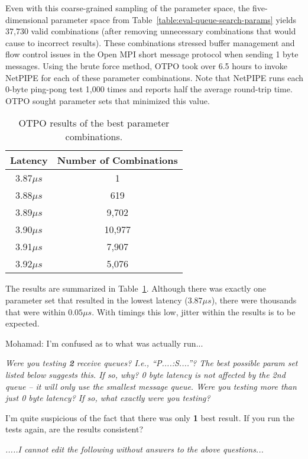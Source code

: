 Even with this coarse-grained sampling of the parameter space, the
five-dimensional parameter space from
Table~\ref{table:eval-queue-search-params} yields 37,730 valid combinations
(after removing unnecessary combinations that would cause to incorrect
results). These combinations stressed buffer management and flow control
issues in the Open MPI short message protocol when sending 1 byte
messages. Using the brute force method, OTPO took over 6.5 hours to invoke
NetPIPE for each of these parameter combinations.  Note that NetPIPE runs each
0-byte ping-pong test 1,000 times and reports half the average round-trip
time.  OTPO sought parameter sets that minimized this value.

\begin{table}[tb]
\centering
\caption{OTPO results of the best parameter combinations.}
\label{table:results} 
\begin{tabular}{|c|c|} \hline
Latency & Number of Combinations \\
\hline
3.87$\mu s$  & 1\\
\hline
3.88$\mu s$  & 619\\
\hline
3.89$\mu s$  & 9,702\\
\hline
3.90$\mu s$  & 10,977\\
\hline
3.91$\mu s$  & 7,907\\
\hline
3.92$\mu s$  & 5,076\\
\hline
\end{tabular}  
\end{table}

The results are summarized in Table~\ref{table:results}.  Although
there was exactly one parameter set that resulted in the lowest
latency ($3.87\mu s$), there were thousands that were within $0.05\mu
s$.  With timings this low, jitter within the results is to be
expected.  

{\Large Mohamad: I'm confused as to what was actually run...}

{\em Were you testing {\bf 2} receive queues?  I.e., ``P....:S....''?
  The best possible param set listed below suggests this.  If so, why?
  0 byte latency is not affected by the 2nd queue -- it will only use
  the smallest message queue.  Were you testing more than just 0 byte
  latency?  If so, what exactly were you testing?}

{\Large I'm quite suspicious of the fact that there was only {\bf 1}
  best result.  If you run the tests again, are the results
  consistent?}

{\em .....I cannot edit the following without answers to the above
  questions...}

